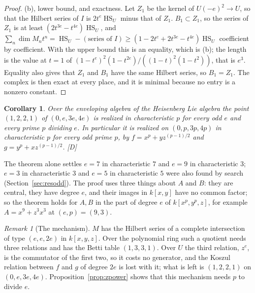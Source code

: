 \documentclass[11pt]{article}
\newtheorem{corollary}{Corollary}
\theoremstyle{definition}
\theoremstyle{remark}
\newtheorem{remark}{Remark}
\newcommand{\Hilb}{\operatorname{HS}}
\begin{document}
\begin{proof}
(b), lower bound, and exactness. Let $Z_1$ be the kernel of $U(-e)^2\to U$, so that the Hilbert series of $I$ is $2t^e\Hilb_U$ minus that of $Z_1$. $B_1\subset Z_1$, so the series of $Z_1$ is at least $(2t^{3e}-t^{4e})\Hilb_U$, and $\sum_n\dim M_nt^n=\Hilb_U-(\text{series of }I)\ge(1-2t^e+2t^{3e}-t^{4e})\Hilb_U$ coefficient by coefficient. With the upper bound this is an equality, which is (b); the length is the value at $t=1$ of $(1-t^e)^2(1-t^{2e})/((1-t)^2(1-t^2))$, that is $e^3$. Equality also gives that $Z_1$ and $B_1$ have the same Hilbert series, so $B_1=Z_1$. The complex is then exact at every place, and it is minimal because no entry is a nonzero constant.
\end{proof}

\begin{corollary}\label{cor:central}
Over the enveloping algebra of the Heisenberg Lie algebra the point $(1,2,2,1)$ of $(0,e,3e,4e)$ is realized in characteristic $p$ for every odd $e$ and every prime $p$ dividing $e$. In particular it is realized on $(0,p,3p,4p)$ in characteristic $p$ for every odd prime $p$, by $f=x^p+yz^{(p-1)/2}$ and $g=y^p+xz^{(p-1)/2}$. [D]
\end{corollary}

The theorem alone settles $e=7$ in characteristic $7$ and $e=9$ in characteristic $3$; $e=3$ in characteristic $3$ and $e=5$ in characteristic $5$ were also found by search (Section~\ref{sec:resodd}). The proof uses three things about $A$ and $B$: they are central, they have degree $e$, and their images in $k[x,y]$ have no common factor; so the theorem holds for $A,B$ in the part of degree $e$ of $k[x^p,y^p,z]$, for example $A=x^9+z^3x^3$ at $(e,p)=(9,3)$.

\begin{remark}[The mechanism]\label{rem:mech}
$M$ has the Hilbert series of a complete intersection of type $(e,e,2e)$ in $k[x,y,z]$. Over the polynomial ring such a quotient needs three relations and has the Betti table $(1,3,3,1)$. Over $U$ the third relation, $z^e$, is the commutator of the first two, so it costs no generator, and the Koszul relation between $f$ and $g$ of degree $2e$ is lost with it; what is left is $(1,2,2,1)$ on $(0,e,3e,4e)$. Proposition~\ref{prop:zpower} shows that this mechanism needs $p$ to divide $e$.
\end{remark}
\end{document}
